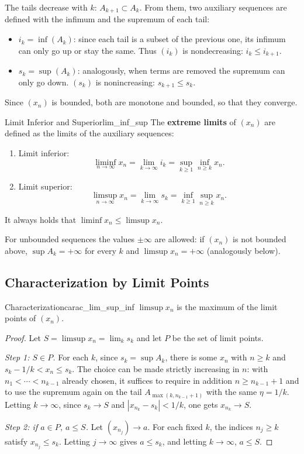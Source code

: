 \documentclass[11pt, a4paper]{article}
\begin{document}
The tails decrease with $k$: $A_{k+1} \subset A_k$. From them, two auxiliary sequences are defined
with the infimum and the supremum of each tail:
\begin{itemize}
    \item $i_k = \inf(A_k)$: since each tail is a subset of the previous one, its infimum can only
    go up or stay the same. Thus $(i_k)$ is nondecreasing: $i_k \le i_{k+1}$.
    \item $s_k = \sup(A_k)$: analogously, when terms are removed the supremum can only go down.
    $(s_k)$ is nonincreasing: $s_{k+1} \le s_k$.
\end{itemize}
Since $(x_n)$ is bounded, both are monotone and bounded, so that they converge.

\begin{definicion}{Limit Inferior and Superior}{lim_inf_sup}
The \textbf{extreme limits} of $(x_n)$ are defined as the limits of the auxiliary sequences:
\begin{enumerate}
    \item Limit inferior:
    $$ \liminf_{n \to \infty} x_n = \lim_{k \to \infty} i_k = \sup_{k \ge 1} \inf_{n \ge k} x_n. $$
    \item Limit superior:
    $$ \limsup_{n \to \infty} x_n = \lim_{k \to \infty} s_k = \inf_{k \ge 1} \sup_{n \ge k} x_n. $$
\end{enumerate}
It always holds that $\liminf x_n \le \limsup x_n$.
\end{definicion}

\obs For unbounded sequences the values $\pm\infty$ are allowed: if $(x_n)$ is not bounded
above, $\sup A_k = +\infty$ for every $k$ and $\limsup x_n = +\infty$ (analogously below).

\subsection{Characterization by Limit Points}

\begin{proposicion}{Characterization}{carac_lim_sup_inf}
$\limsup x_n$ is the maximum of the limit points of $(x_n)$.
\end{proposicion}

\begin{proof}
Let $S = \limsup x_n = \lim_k s_k$ and let $P$ be the set of limit points.

\textit{Step 1: $S \in P$.} For each $k$, since $s_k = \sup A_k$, there is some $x_n$
with $n \ge k$ and $s_k - 1/k < x_n \le s_k$.
The choice can be made strictly increasing in $n$:
with $n_1 < \cdots < n_{k-1}$ already chosen, it suffices to require in addition $n \ge n_{k-1} + 1$
and to use the supremum again on the tail $A_{\max(k, n_{k-1}+1)}$ with the same $\eta = 1/k$.
Letting $k \to \infty$, since $s_k \to S$ and $|x_{n_k} - s_k| < 1/k$, one gets $x_{n_k} \to S$.

\textit{Step 2: if $a \in P$, $a \le S$.} Let $(x_{n_j}) \to a$.
For each fixed $k$, the indices $n_j \ge k$ satisfy $x_{n_j} \le s_k$.
Letting $j \to \infty$ gives $a \le s_k$, and letting $k \to \infty$, $a \le S$.
\end{proof}
\end{document}
